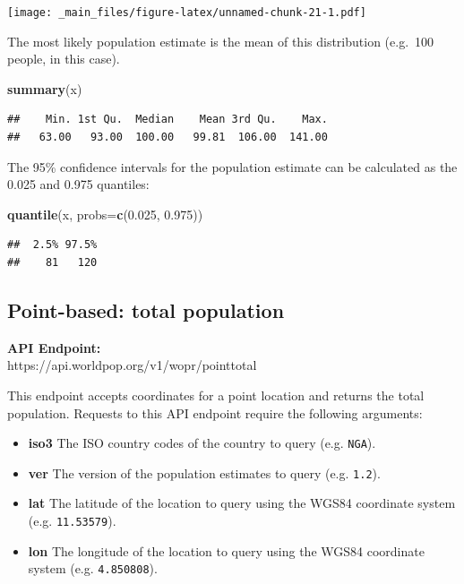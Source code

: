 \documentclass[]{book}
\newenvironment{Shaded}{\begin{snugshade}}{\end{snugshade}}
\newcommand{\KeywordTok}[1]{\textcolor[rgb]{0.13,0.29,0.53}{\textbf{#1}}}
\newcommand{\DataTypeTok}[1]{\textcolor[rgb]{0.13,0.29,0.53}{#1}}
\newcommand{\FloatTok}[1]{\textcolor[rgb]{0.00,0.00,0.81}{#1}}
\newcommand{\NormalTok}[1]{#1}
\begin{document}
\texttt{[image: \_main\_files/figure-latex/unnamed-chunk-21-1.pdf]}

The most likely population estimate is the mean of this distribution
(e.g.~100 people, in this case).

\begin{Shaded}
\begin{Highlighting}[]
\KeywordTok{summary}\NormalTok{(x)}
\end{Highlighting}
\end{Shaded}

\begin{verbatim}
##    Min. 1st Qu.  Median    Mean 3rd Qu.    Max. 
##   63.00   93.00  100.00   99.81  106.00  141.00
\end{verbatim}

The 95\% confidence intervals for the population estimate can be
calculated as the 0.025 and 0.975 quantiles:

\begin{Shaded}
\begin{Highlighting}[]
\KeywordTok{quantile}\NormalTok{(x, }\DataTypeTok{probs=}\KeywordTok{c}\NormalTok{(}\FloatTok{0.025}\NormalTok{, }\FloatTok{0.975}\NormalTok{))}
\end{Highlighting}
\end{Shaded}

\begin{verbatim}
##  2.5% 97.5% 
##    81   120
\end{verbatim}

\subsection{Point-based: total
population}\label{point-based-total-population}

\textbf{API Endpoint:}\\
https://api.worldpop.org/v1/wopr/pointtotal

This endpoint accepts coordinates for a point location and returns the
total population. Requests to this API endpoint require the following
arguments:

\begin{itemize}
\item
  \textbf{iso3} The ISO country codes of the country to query (e.g.
  \texttt{NGA}).
\item
  \textbf{ver} The version of the population estimates to query (e.g.
  \texttt{1.2}).
\item
  \textbf{lat} The latitude of the location to query using the WGS84
  coordinate system (e.g. \texttt{11.53579}).
\item
  \textbf{lon} The longitude of the location to query using the WGS84
  coordinate system (e.g. \texttt{4.850808}).
\end{itemize}
\end{document}
